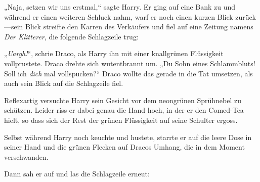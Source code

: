 „Naja, setzen wir uns erstmal,“ sagte Harry. Er ging auf eine Bank zu und während er einen weiteren Schluck nahm, warf er noch einen kurzen Blick zurück—sein Blick streifte den Karren des Verkäufers und fiel auf eine Zeitung namens \emph{Der Klitterer}, die folgende Schlagzeile trug:


„\emph{Uargh!}“, schrie Draco, als Harry ihn mit einer knallgrünen Flüssigkeit vollprustete. Draco drehte sich wutentbrannt um. „Du Sohn eines Schlammbluts! Soll ich \emph{dich} mal vollspucken?“ Draco wollte das gerade in die Tat umsetzen, als auch sein Blick auf die Schlagzeile fiel.

Reflexartig versuchte Harry sein Gesicht vor dem neongrünen Sprühnebel zu schützen. Leider riss er dabei genau die Hand hoch, in der er den Comed-Tea hielt, so dass sich der Rest der grünen Flüssigkeit auf seine Schulter ergoss.

Selbst während Harry noch keuchte und hustete, starrte er auf die leere Dose in seiner Hand und die grünen Flecken auf Dracos Umhang, die in dem Moment verschwanden.

Dann sah er auf und las die Schlagzeile erneut:


